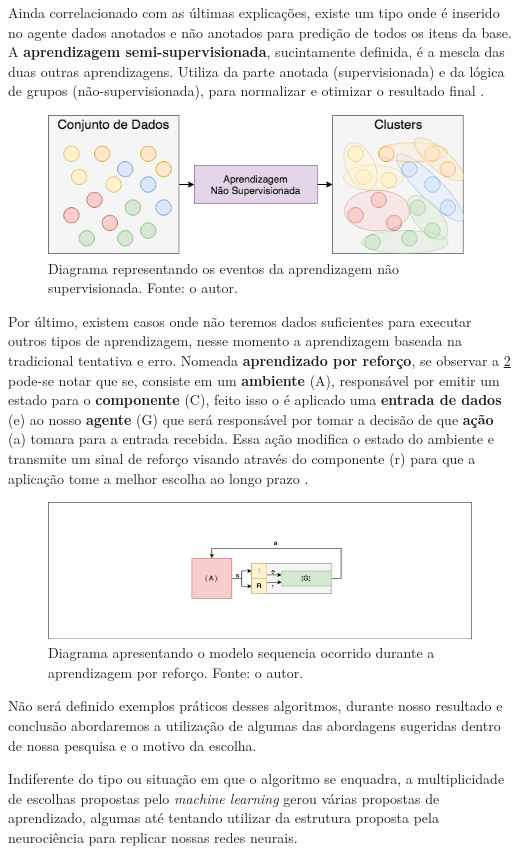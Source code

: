 Ainda correlacionado com as últimas explicações, existe um tipo onde é inserido no agente dados anotados e não anotados para predição de todos os itens da base. A \textbf{aprendizagem semi-supervisionada}, sucintamente definida, é a mescla das duas outras aprendizagens. Utiliza da parte anotada (supervisionada) e da lógica de grupos (não-supervisionada), para normalizar e otimizar o resultado final \cite[7]{mohri2012foundations}.

\begin{figure}
    \centering
    \includegraphics[width=.8\textwidth]{imagens/unsupervised.png}
    \caption{Diagrama representando os eventos da aprendizagem não supervisionada. Fonte: o autor.}
    \label{fig:unsupervised}
\end{figure}

Por último, existem casos onde não teremos dados suficientes para executar outros tipos de aprendizagem, nesse momento a aprendizagem baseada na tradicional tentativa e erro. Nomeada \textbf{aprendizado por reforço}, se observar a \ref{fig:reinforcement} pode-se notar que se, consiste em um \textbf{ambiente} (A), responsável por emitir um estado para o \textbf{componente} (C), feito isso o é aplicado uma \textbf{entrada de dados} (e) ao nosso \textbf{agente} (G) que será responsável por tomar a decisão de que \textbf{ação} (a) tomara para a entrada recebida. Essa ação modifica o estado do ambiente e transmite um sinal de reforço visando através do componente (r) para que a aplicação tome a melhor escolha ao longo prazo \cite{kaelbling1996reinforcement, russell2003artificial}.

\begin{figure}
    \centering
    \includegraphics[width=.8\textwidth]{imagens/reinforcement.png}
    \caption{Diagrama apresentando o modelo sequencia ocorrido durante a aprendizagem por reforço. Fonte: o autor.}
    \label{fig:reinforcement}
\end{figure}

Não será definido exemplos práticos desses algoritmos, durante nosso resultado e conclusão abordaremos a utilização de algumas das abordagens sugeridas dentro de nossa pesquisa e o motivo da escolha.

Indiferente do tipo ou situação em que o algoritmo se enquadra, a multiplicidade de escolhas propostas pelo \textit{machine learning} gerou várias propostas de aprendizado, algumas até tentando utilizar da estrutura proposta pela neurociência para replicar nossas redes neurais.
